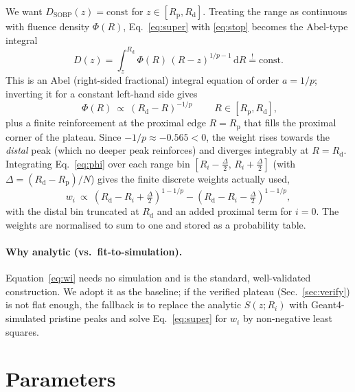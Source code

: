 \documentclass[11pt]{article}
\newcommand{\Rd}{R_{\mathrm d}}
\newcommand{\Rp}{R_{\mathrm p}}
\begin{document}
We want $D_{\mathrm{SOBP}}(z)=\text{const}$ for $z\in[\Rp,\Rd]$. Treating the
range as continuous with fluence density $\Phi(R)$, Eq.~\eqref{eq:super} with
\eqref{eq:stop} becomes the Abel-type integral
\begin{equation}
D(z)=\int_z^{\Rd}\Phi(R)\,(R-z)^{1/p-1}\,\mathrm dR \stackrel{!}{=}\text{const}.
\end{equation}
This is an Abel (right-sided fractional) integral equation of order $a=1/p$;
inverting it for a constant left-hand side gives
\begin{equation}
\boxed{\;\Phi(R)\ \propto\ (\Rd-R)^{-1/p}\;}\qquad R\in[\Rp,\Rd],
\label{eq:phi}
\end{equation}
plus a finite reinforcement at the proximal edge $R=\Rp$ that fills the proximal
corner of the plateau. Since $-1/p\approx-0.565<0$, the weight rises towards the
\emph{distal} peak (which no deeper peak reinforces) and diverges integrably at
$R=\Rd$. Integrating Eq.~\eqref{eq:phi} over each range bin
$[R_i-\tfrac{\Delta}{2},\,R_i+\tfrac{\Delta}{2}]$ (with $\Delta=(\Rd-\Rp)/N$)
gives the finite discrete weights actually used,
\begin{equation}
w_i\ \propto\ (\Rd-R_i+\tfrac{\Delta}{2})^{1-1/p}-(\Rd-R_i-\tfrac{\Delta}{2})^{1-1/p},
\label{eq:wi}
\end{equation}
with the distal bin truncated at $\Rd$ and an added proximal term for $i=0$.
The weights are normalised to sum to one and stored as a probability table.

\paragraph{Why analytic (vs.\ fit-to-simulation).} Equation~\eqref{eq:wi} needs
no simulation and is the standard, well-validated construction. We adopt it as
the baseline; if the verified plateau (Sec.~\ref{sec:verify}) is not flat enough,
the fallback is to replace the analytic $S(z;R_i)$ with Geant4-simulated pristine
peaks and solve Eq.~\eqref{eq:super} for $w_i$ by non-negative least squares.

\section{Parameters}
\label{sec:params}
\end{document}
